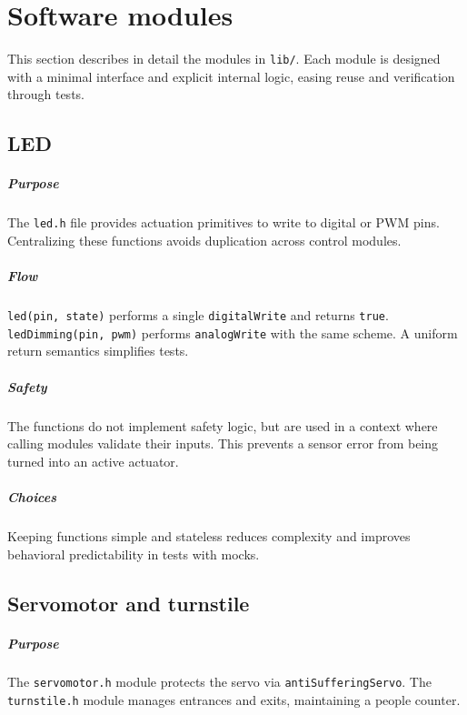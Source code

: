 \chapter{Software modules}

This section describes in detail the modules in \texttt{lib/}. Each module is designed with a minimal interface and explicit internal logic, easing reuse and verification through tests.

\section{LED}
\paragraph{Purpose} The \texttt{led.h} file provides actuation primitives to write to digital or PWM pins. Centralizing these functions avoids duplication across control modules.

\paragraph{Flow} \texttt{led(pin, state)} performs a single \texttt{digitalWrite} and returns \texttt{true}. \texttt{ledDimming(pin, pwm)} performs \texttt{analogWrite} with the same scheme. A uniform return semantics simplifies tests.

\paragraph{Safety} The functions do not implement safety logic, but are used in a context where calling modules validate their inputs. This prevents a sensor error from being turned into an active actuator.

\paragraph{Choices} Keeping functions simple and stateless reduces complexity and improves behavioral predictability in tests with mocks.

\section{Servomotor and turnstile}
\paragraph{Purpose} The \texttt{servomotor.h} module protects the servo via \texttt{antiSufferingServo}.\linebreak
The \texttt{turnstile.h} module manages entrances and exits, maintaining a people counter.

